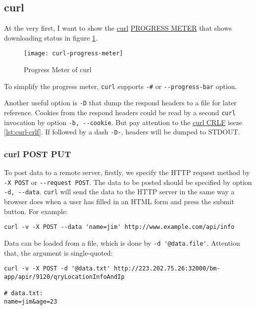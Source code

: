 \subsection{curl}
\label{sec:curl}

At the very first, I want to show the
\href{https://github.com/curl/curl}{curl}
\href{https://ec.haxx.se/cmdline-progressmeter.html}{PROGRESS
  METER} that shows downloading status in figure
\ref{fig:progress-meter-curl}.

\begin{figure}[tbp]
  \centering
  \texttt{[image: curl-progress-meter]}
  \caption{Progress Meter of curl}
  \label{fig:progress-meter-curl}
\end{figure}

To simplify the progress meter, \lstinline|curl| supports
\lstinline|-#| or \lstinline|--progress-bar| option.

Another useful option is \lstinline|-D| that dump the respond
headers to a file for later reference. Cookies from the respond
headers could be read by a second \lstinline|curl| invocation by
option \lstinline|-b, --cookie|. But pay attention to the
\uline{curl CRLF} issue \ref{lst:curl-crlf}. If followed by a dash
\lstinline|-D-|, headers will be dumped to STDOUT.

\subsubsection{curl POST PUT}
\label{sec:curl-post-put}

To post data to a remote server, firstly, we specify the HTTP
request method by \lstinline|-X POST| or
\lstinline|--request POST|. The data to be posted should be
specified by option \lstinline|-d, --data|. \lstinline|curl| will
send the data to the HTTP server in the same way a browser does
when a user has filled in an HTML form and press the submit
button. For example:

\begin{lstlisting}
curl -v -X POST --data 'name=jim' http://www.example.com/api/info
\end{lstlisting}

Data can be loaded from a file, which is done by
\lstinline|-d '@data.file'|. Attention that, the argument is
single-quoted:

\begin{lstlisting}
curl -v -X POST -d '@data.txt' http://223.202.75.26:32000/bm-app/apir/9120/qryLocationInfoAndIp

# data.txt:
name=jim&age=23
\end{lstlisting}

